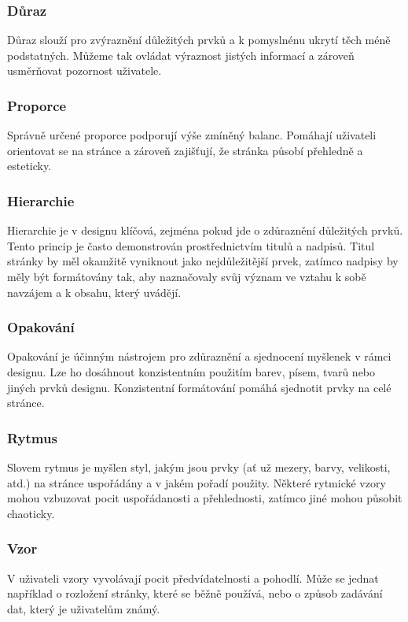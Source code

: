 \subsubsection*{Důraz}
Důraz slouží pro zvýraznění důležitých prvků a k pomyslnénu ukrytí těch méně podstatných. Můžeme tak ovládat výraznost jistých informací a zároveň usměrňovat pozornost uživatele.

\subsubsection*{Proporce}
Správně určené proporce podporují výše zmíněný balanc. Pomáhají uživateli orientovat se na stránce a zároveň zajišťují, že stránka působí přehledně a esteticky.

\subsubsection*{Hierarchie}
Hierarchie je v designu klíčová, zejména pokud jde o zdůraznění důležitých prvků. Tento princip je často demonstrován prostřednictvím titulů a nadpisů. Titul stránky by měl okamžitě vyniknout jako nejdůležitější prvek, zatímco nadpisy by měly být formátovány tak, aby naznačovaly svůj význam ve vztahu k sobě navzájem a k obsahu, který uvádějí.

\subsubsection*{Opakování}
Opakování je účinným nástrojem pro zdůraznění a sjednocení myšlenek v rámci designu. Lze ho dosáhnout konzistentním použitím barev, písem, tvarů nebo jiných prvků designu. Konzistentní formátování pomáhá sjednotit prvky na celé stránce.

\subsubsection*{Rytmus}
Slovem rytmus je myšlen styl, jakým jsou prvky (ať už mezery, barvy, velikosti, atd.) na stránce uspořádány a v jakém pořadí použity. Některé rytmické vzory mohou vzbuzovat pocit uspořádanosti a přehlednosti, zatímco jiné mohou působit chaoticky.

\subsubsection*{Vzor}
V uživateli vzory vyvolávají pocit předvídatelnosti a pohodlí. Může se jednat například o rozložení stránky, které se běžně používá, nebo o způsob zadávání dat, který je uživatelům známý.


